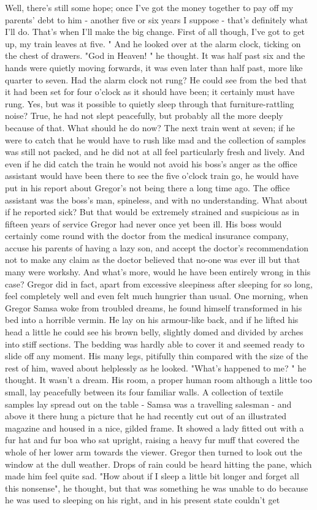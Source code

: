 \documentclass[listoffigures, listoftables]{ifathesis}
\begin{document}
Well, there's still some hope; once I've got the money together to pay off my parents' debt to him - another five or six years I suppose - that's definitely what I'll do. That's when I'll make the big change. First of all though, I've got to get up, my train leaves at five. " And he looked over at the alarm clock, ticking on the chest of drawers. "God in Heaven! " he thought. It was half past six and the hands were quietly moving forwards, it was even later than half past, more like quarter to seven. Had the alarm clock not rung? He could see from the bed that it had been set for four o'clock as it should have been; it certainly must have rung. Yes, but was it possible to quietly sleep through that furniture-rattling noise? True, he had not slept peacefully, but probably all the more deeply because of that. What should he do now? The next train went at seven; if he were to catch that he would have to rush like mad and the collection of samples was still not packed, and he did not at all feel particularly fresh and lively. And even if he did catch the train he would not avoid his boss's anger as the office assistant would have been there to see the five o'clock train go, he would have put in his report about Gregor's not being there a long time ago. The office assistant was the boss's man, spineless, and with no understanding. What about if he reported sick? But that would be extremely strained and suspicious as in fifteen years of service Gregor had never once yet been ill. His boss would certainly come round with the doctor from the medical insurance company, accuse his parents of having a lazy son, and accept the doctor's recommendation not to make any claim as the doctor believed that no-one was ever ill but that many were workshy. And what's more, would he have been entirely wrong in this case? Gregor did in fact, apart from excessive sleepiness after sleeping for so long, feel completely well and even felt much hungrier than usual. One morning, when Gregor Samsa woke from troubled dreams, he found himself transformed in his bed into a horrible vermin. He lay on his armour-like back, and if he lifted his head a little he could see his brown belly, slightly domed and divided by arches into stiff sections. The bedding was hardly able to cover it and seemed ready to slide off any moment. His many legs, pitifully thin compared with the size of the rest of him, waved about helplessly as he looked. "What's happened to me? " he thought. It wasn't a dream. His room, a proper human room although a little too small, lay peacefully between its four familiar walls. A collection of textile samples lay spread out on the table - Samsa was a travelling salesman - and above it there hung a picture that he had recently cut out of an illustrated magazine and housed in a nice, gilded frame. It showed a lady fitted out with a fur hat and fur boa who sat upright, raising a heavy fur muff that covered the whole of her lower arm towards the viewer. Gregor then turned to look out the window at the dull weather. Drops of rain could be heard hitting the pane, which made him feel quite sad. "How about if I sleep a little bit longer and forget all this nonsense", he thought, but that was something he was unable to do because he was used to sleeping on his right, and in his present state couldn't get 
\end{document}
